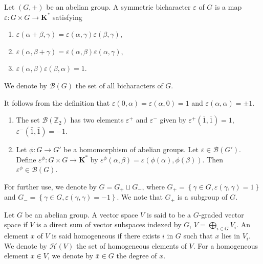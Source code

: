 \documentclass[11pt, twoside]{article}
\begin{document}
\begin{defi}
    Let $(G,+)$ be an abelian group. A symmetric bicharacter $\varepsilon$ of $G$ is a map $\varepsilon:G\times G\to \mathbf{K}^* $ satisfying \begin{enumerate}
        \item $\varepsilon(\alpha+\beta,\gamma)= \varepsilon(\alpha,\gamma)\varepsilon(\beta,\gamma) $,
        \item $\varepsilon(\alpha,\beta+\gamma)= \varepsilon(\alpha,\beta)\varepsilon(\alpha,\gamma) $,
        \item $ \varepsilon(\alpha,\beta)\varepsilon(\beta,\alpha) =1$.
    \end{enumerate} We denote by $\mathcal{B}(G)$ the set of all bicharacters of $G$.
\end{defi}
It follows from the definition that $\varepsilon(0,\alpha)=\varepsilon(\alpha,0)=1 $ and $\varepsilon(\alpha,\alpha)= \pm 1 $.

\begin{ex}
    
    \begin{enumerate}
        \item The set $\mathcal{B}(\mathbb{Z}_2) $ has two elements $\varepsilon^+$ and $\varepsilon^-$ given by $\varepsilon^+(\bar{1},\bar{1})=1$, $\varepsilon^-(\bar{1},\bar{1})= -1 $.
        \item Let $\phi:G\to G'$ be a homomorphism of abelian groups. Let $\varepsilon \in \mathcal{B}(G')$. Define $\varepsilon^{\phi}: G\times G\to \mathbf{K}^* $ by $\varepsilon^{\phi}(\alpha,\beta)= \varepsilon(\phi(\alpha),\phi(\beta)) $. Then $\varepsilon^{\phi}\in \mathcal{B}(G) $.
    \end{enumerate}
\end{ex}
For further use, we denote by $G=G_+\sqcup G_- $, where $G_+= \left\{\gamma\in G, \varepsilon(\gamma,\gamma)=1 \right\}  $ and $G_-= \left\{\gamma\in G, \varepsilon(\gamma,\gamma)=-1 \right\} $. We note that $G_+ $ is a subgroup of $G$.

\begin{defi}
    Let $G$ be an abelian group. A   vector space $V$ is said to be a $G$-graded vector space if $V$ is  a direct sum of vector subspaces indexed by $G$, $V=\bigoplus\limits_{i\in G}V_i $. An element $x$ of $V$ is said homogeneous if there exists $i$ in $G$ such that $x$ lies in $V_i$. We denote by $\mathcal{H}(V)$ the set of homogeneous elements of $V$. For a homogeneous element $x\in V$, we denote by $\bar{x}\in G $ the degree of $x$.
\end{defi}
\end{document}
